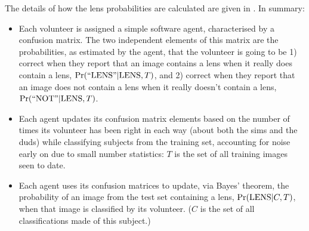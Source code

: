 \documentclass[useAMS,usenatbib,a4paper]{mn2e}
\begin{document}
The details of how the lens probabilities are calculated are given in
. In summary:
\begin{itemize}

\item Each volunteer is assigned a simple software agent, characterised by a
confusion matrix. The two independent elements of this matrix are the
probabilities, as estimated by the agent, that the volunteer is going to be 1)
correct when they report that an image contains a lens when it really does
contain a lens, ${\rm Pr}({\rm ``LENS"}|{\rm LENS},T)$, and 2) correct when they report that
an image does not contain a lens when it really doesn't contain a lens,
${\rm Pr}({\rm ``NOT"}|{\rm LENS},T)$.

\item Each agent updates its confusion matrix elements based on the number of
times its volunteer has been right in each way (about both the sims and the
duds) while classifying subjects from the training set, accounting for noise
early on due to small number statistics: $T$ is the set of all training images
seen to date.

\item Each agent uses its confusion matrices to update, via Bayes' theorem,
the probability of an image from the test set containing a lens,
${\rm Pr}({\rm LENS}|C,T)$, when that image is classified by its volunteer. ($C$ is the
set of all classifications made of this subject.)

\end{itemize}
\end{document}

